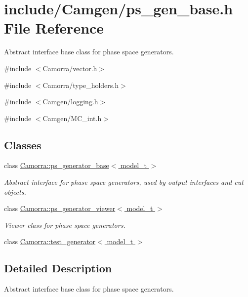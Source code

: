 \hypertarget{a00584}{
\section{include/Camgen/ps\_\-gen\_\-base.h File Reference}
\label{a00584}
}


Abstract interface base class for phase space generators.  


{\ttfamily \#include $<$Camorra/vector.h$>$}\par
{\ttfamily \#include $<$Camorra/type\_\-holders.h$>$}\par
{\ttfamily \#include $<$Camgen/logging.h$>$}\par
{\ttfamily \#include $<$Camgen/MC\_\-int.h$>$}\par
\subsection*{Classes}
\begin{DoxyCompactItemize}
\item 
class \hyperlink{a00408}{Camorra::ps\_\-generator\_\-base$<$ model\_\-t $>$}
\begin{DoxyCompactList}\small\item\em Abstract interface for phase space generators, used by output interfaces and cut objects. \end{DoxyCompactList}\item 
class \hyperlink{a00410}{Camorra::ps\_\-generator\_\-viewer$<$ model\_\-t $>$}
\begin{DoxyCompactList}\small\item\em Viewer class for phase space generators. \end{DoxyCompactList}\item 
class \hyperlink{a00485}{Camorra::test\_\-generator$<$ model\_\-t $>$}
\end{DoxyCompactItemize}


\subsection{Detailed Description}
Abstract interface base class for phase space generators. 